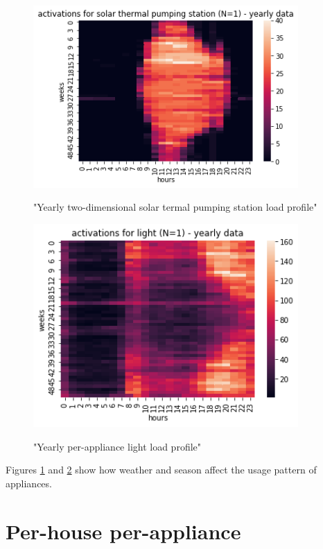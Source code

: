 \begin{figure}[H]
	\centering
	\caption{"Yearly two-dimensional solar termal pumping station load profile"}
	\includegraphics[width=0.9\textwidth]{../Figures/LPS/solar termal pumping station.png}
	\label{fig:solar termal pumping station}
\end{figure}
\begin{figure}[H]
	\centering
	\caption{"Yearly per-appliance light load profile"}
	\includegraphics[width=0.9\textwidth]{../Figures/LPS/light.png}
	\label{fig:light}
\end{figure}

Figures \ref{fig:solar termal pumping station} and \ref{fig:light} 
show how weather and season affect the usage pattern of appliances. 

\section{Per-house per-appliance}

